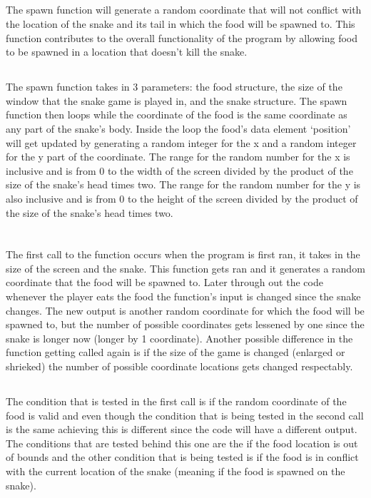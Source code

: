 \documentclass{article}
\begin{document}
\subsection{}
The spawn function will generate a random coordinate that will not conflict with the location of the snake and its tail in which the food will be spawned to. This function contributes to the overall functionality of the program by allowing food to be spawned in a location that doesn’t kill the snake.
\subsection{}
The spawn function takes in 3 parameters: the food structure, the size of the window that the snake game is played in, and the snake structure. The spawn function then loops while the coordinate of the food is the same coordinate as any part of the snake’s body. Inside the loop the food’s data element ‘position’ will get updated by generating a random integer for the x and a random integer for the y part of the coordinate. The range for the random number for the x is inclusive and is from 0 to the width of the screen divided by the product of the size of the snake’s head times two. The range for the random number for the y is also inclusive and is from 0 to the height of the screen divided by the product of the size of the snake’s head times two.

\section{}
\subsection{}
The first call to the function occurs when the program is first ran, it takes in the size of the screen and the snake. This function gets ran and it generates a random coordinate that the food will be spawned to. Later through out the code whenever the player eats the food the function’s input is changed since the snake changes. The new output is another random coordinate for which the food will be spawned to, but the number of possible coordinates gets lessened by one since the snake is longer now (longer by 1 coordinate). Another possible difference in the function getting called again is if the size of the game is changed (enlarged or shrieked) the number of possible coordinate locations gets changed respectably. 
\subsection{}
The condition that is tested in the first call is if the random coordinate of the food is valid and even though the condition that is being tested in the second call is the same achieving this is different since the code will have a different output. The conditions that are tested behind this one are the if the food location is out of bounds and the other condition that is being tested is if the food is in conflict with the current location of the snake (meaning if the food is spawned on the snake).
\end{document}
